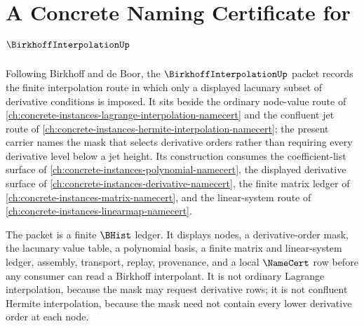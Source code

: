 \chapter{A Concrete Naming Certificate for $\BirkhoffInterpolationUp$}
\label{ch:concrete-instances-birkhoff-interpolation-namecert}

Following Birkhoff and de Boor, the $\BirkhoffInterpolationUp$ packet records the finite interpolation route in which only a displayed lacunary subset of derivative conditions is imposed. It sits beside the ordinary node-value route of \autoref{ch:concrete-instances-lagrange-interpolation-namecert} and the confluent jet route of \autoref{ch:concrete-instances-hermite-interpolation-namecert}; the present carrier names the mask that selects derivative orders rather than requiring every derivative level below a jet height. Its construction consumes the coefficient-list surface of \autoref{ch:concrete-instances-polynomial-namecert}, the displayed derivative surface of \autoref{ch:concrete-instances-derivative-namecert}, the finite matrix ledger of \autoref{ch:concrete-instances-matrix-namecert}, and the linear-system route of \autoref{ch:concrete-instances-linearmap-namecert}.

The packet is a finite $\BHist$ ledger. It displays nodes, a derivative-order mask, the lacunary value table, a polynomial basis, a finite matrix and linear-system ledger, assembly, transport, replay, provenance, and a local $\NameCert$ row before any consumer can read a Birkhoff interpolant. It is not ordinary Lagrange interpolation, because the mask may request derivative rows; it is not confluent Hermite interpolation, because the mask need not contain every lower derivative order at each node.


